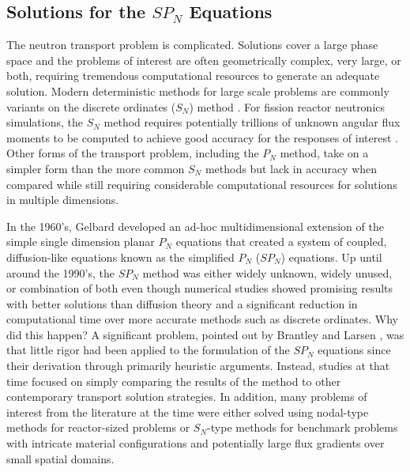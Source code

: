 \subsection{Solutions for the $SP_N$ Equations}
\label{subsec:spn_motiviation}
The neutron transport problem is complicated. Solutions cover a large
phase space and the problems of interest are often geometrically
complex, very large, or both, requiring tremendous computational
resources to generate an adequate solution. Modern deterministic
methods for large scale problems are commonly variants on the discrete
ordinates ($S_N$) method \cite{evans_denovo:_2010}. For fission
reactor neutronics simulations, the $S_N$ method requires potentially
trillions of unknown angular flux moments to be computed to achieve
good accuracy for the responses of interest
\cite{slaybaugh_acceleration_2011}. Other forms of the transport
problem, including the $P_N$ method, take on a simpler form than the
more common $S_N$ methods but lack in accuracy when compared while
still requiring considerable computational resources for solutions in
multiple dimensions.

In the 1960's, Gelbard developed an ad-hoc multidimensional extension
of the simple single dimension planar $P_N$ equations that created a
system of coupled, diffusion-like equations known as the simplified
$P_N$ ($SP_N$) equations. Up until around the 1990's, the $SP_N$
method was either widely unknown, widely unused, or combination of
both even though numerical studies showed promising results with
better solutions than diffusion theory and a significant reduction in
computational time over more accurate methods such as discrete
ordinates. Why did this happen? A significant problem, pointed out by
Brantley and Larsen \cite{brantley_simplified_2000}, was that little
rigor had been applied to the formulation of the $SP_N$ equations
since their derivation through primarily heuristic arguments. Instead,
studies at that time focused on simply comparing the results of the
method to other contemporary transport solution strategies. In
addition, many problems of interest from the literature at the time
were either solved using nodal-type methods for reactor-sized problems
or $S_N$-type methods for benchmark problems with intricate material
configurations and potentially large flux gradients over small spatial
domains.

